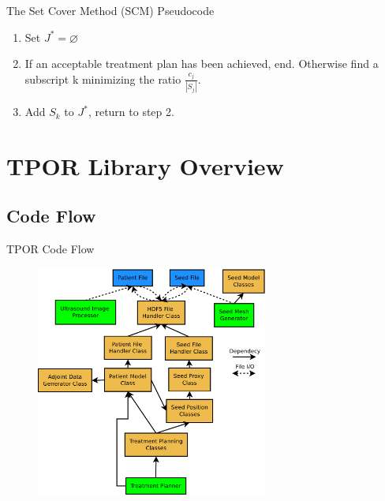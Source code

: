 \documentclass{beamer}
\begin{document}
\begin{frame}{The Set Cover Method (SCM) Pseudocode}

  \begin{enumerate}
    \item Set $J^{*} = \varnothing$
      \medskip
    \item If an acceptable treatment plan has been achieved, end. Otherwise
      find a subscript k minimizing the ratio $\frac{c_j}{|S_j|}$.
      \medskip
    \item Add $S_k$ to $J^{*}$, return to step 2.
  \end{enumerate}

\end{frame}

\section{TPOR Library Overview}
\subsection{Code Flow}
\begin{frame}{TPOR Code Flow}

  \begin{figure}[h!]
    \begin{center}
      \includegraphics[width=3in,height=3in]{figures/TPOR_code_flow.pdf}
    \end{center}
  \end{figure}

\end{frame}
\end{document}
